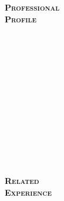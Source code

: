 \documentclass[12pt]{article}
\begin{document}
\begin{minipage}[t]{0.2\linewidth} 
	\textbf{\textsc{
	\hspace{-5pt}Professional\\Profile \\ \\ \\ \\ \\ \\ \\ \\ \\ \\ \\ \\ \\ \\ 
	Related\\Experience
	}}
\end{minipage}
\end{document}
